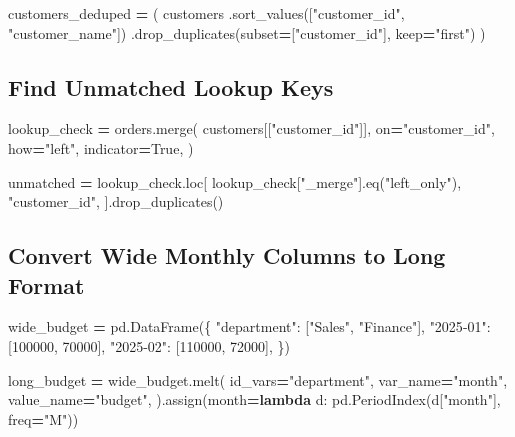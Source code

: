 \documentclass[
  12pt,
]{article}
\newenvironment{Shaded}{\begin{snugshade}}{\end{snugshade}}
\newcommand{\DecValTok}[1]{\textcolor[rgb]{0.00,0.00,0.81}{#1}}
\newcommand{\KeywordTok}[1]{\textcolor[rgb]{0.13,0.29,0.53}{\textbf{#1}}}
\newcommand{\NormalTok}[1]{#1}
\newcommand{\OperatorTok}[1]{\textcolor[rgb]{0.81,0.36,0.00}{\textbf{#1}}}
\newcommand{\StringTok}[1]{\textcolor[rgb]{0.31,0.60,0.02}{#1}}
\newcommand{\VariableTok}[1]{\textcolor[rgb]{0.00,0.00,0.00}{#1}}
\begin{document}
\begin{Shaded}
\begin{Highlighting}[]
\NormalTok{customers\_deduped }\OperatorTok{=}\NormalTok{ (}
\NormalTok{    customers}
\NormalTok{    .sort\_values([}\StringTok{"customer\_id"}\NormalTok{, }\StringTok{"customer\_name"}\NormalTok{])}
\NormalTok{    .drop\_duplicates(subset}\OperatorTok{=}\NormalTok{[}\StringTok{"customer\_id"}\NormalTok{], keep}\OperatorTok{=}\StringTok{"first"}\NormalTok{)}
\NormalTok{)}
\end{Highlighting}
\end{Shaded}

\subsection{Find Unmatched Lookup
Keys}\label{find-unmatched-lookup-keys}

\begin{Shaded}
\begin{Highlighting}[]
\NormalTok{lookup\_check }\OperatorTok{=}\NormalTok{ orders.merge(}
\NormalTok{    customers[[}\StringTok{"customer\_id"}\NormalTok{]],}
\NormalTok{    on}\OperatorTok{=}\StringTok{"customer\_id"}\NormalTok{,}
\NormalTok{    how}\OperatorTok{=}\StringTok{"left"}\NormalTok{,}
\NormalTok{    indicator}\OperatorTok{=}\VariableTok{True}\NormalTok{,}
\NormalTok{)}

\NormalTok{unmatched }\OperatorTok{=}\NormalTok{ lookup\_check.loc[}
\NormalTok{    lookup\_check[}\StringTok{"\_merge"}\NormalTok{].eq(}\StringTok{"left\_only"}\NormalTok{),}
    \StringTok{"customer\_id"}\NormalTok{,}
\NormalTok{].drop\_duplicates()}
\end{Highlighting}
\end{Shaded}

\subsection{Convert Wide Monthly Columns to Long
Format}\label{convert-wide-monthly-columns-to-long-format}

\begin{Shaded}
\begin{Highlighting}[]
\NormalTok{wide\_budget }\OperatorTok{=}\NormalTok{ pd.DataFrame(\{}
    \StringTok{"department"}\NormalTok{: [}\StringTok{"Sales"}\NormalTok{, }\StringTok{"Finance"}\NormalTok{],}
    \StringTok{"2025{-}01"}\NormalTok{: [}\DecValTok{100000}\NormalTok{, }\DecValTok{70000}\NormalTok{],}
    \StringTok{"2025{-}02"}\NormalTok{: [}\DecValTok{110000}\NormalTok{, }\DecValTok{72000}\NormalTok{],}
\NormalTok{\})}

\NormalTok{long\_budget }\OperatorTok{=}\NormalTok{ wide\_budget.melt(}
\NormalTok{    id\_vars}\OperatorTok{=}\StringTok{"department"}\NormalTok{,}
\NormalTok{    var\_name}\OperatorTok{=}\StringTok{"month"}\NormalTok{,}
\NormalTok{    value\_name}\OperatorTok{=}\StringTok{"budget"}\NormalTok{,}
\NormalTok{).assign(month}\OperatorTok{=}\KeywordTok{lambda}\NormalTok{ d: pd.PeriodIndex(d[}\StringTok{"month"}\NormalTok{], freq}\OperatorTok{=}\StringTok{"M"}\NormalTok{))}
\end{Highlighting}
\end{Shaded}
\end{document}

